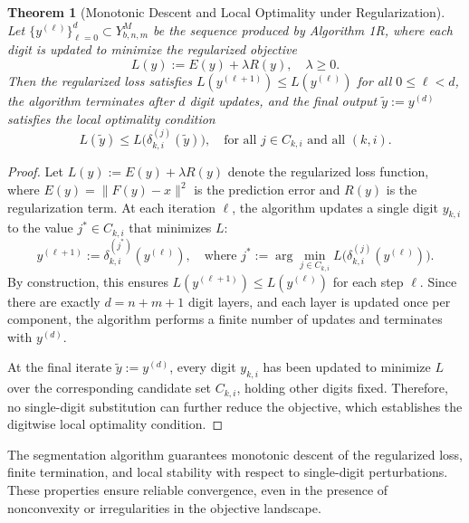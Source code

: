 \documentclass[aps,twocolumn,superscriptaddress,nofootinbib]{revtex4}
\newtheorem{theorem}{Theorem}
\begin{document}
\begin{theorem}[Monotonic Descent and Local Optimality under Regularization]
Let $\{y^{(\ell)}\}_{\ell = 0}^{d} \subset Y^M_{b,n,m}$ be the sequence produced by Algorithm 1R, where each digit is updated to minimize the regularized objective
\begin{equation}
    L(y) := E(y) + \lambda R(y), \quad \lambda \geq 0. \label{eq:regularized-loss}
\end{equation}
Then the regularized loss satisfies $L(y^{(\ell+1)}) \leq L(y^{(\ell)})$ for all $0 \leq \ell < d$, the algorithm terminates after $d$ digit updates, and the final output $\tilde{y} := y^{(d)}$ satisfies the local optimality condition
\begin{equation}
    L(\tilde{y}) \leq L\big(\delta^{(j)}_{k,i}(\tilde{y})\big), \quad \text{for all } j \in C_{k,i} \text{ and all } (k,i). \label{eq:local-minimum}
\end{equation}
\end{theorem}

\begin{proof}
Let $L(y) := E(y) + \lambda R(y)$ denote the regularized loss function, where $E(y) = \|F(y) - x\|^2$ is the prediction error and $R(y)$ is the regularization term. At each iteration $\ell$, the algorithm updates a single digit $y_{k,i}$ to the value $j^* \in C_{k,i}$ that minimizes $L$:
\begin{equation}
    y^{(\ell+1)} := \delta^{(j^*)}_{k,i}(y^{(\ell)}), \quad \text{where } j^* := \arg\min_{j \in C_{k,i}} L\big(\delta^{(j)}_{k,i}(y^{(\ell)})\big). \label{eq:digitwise-selection}
\end{equation}
By construction, this ensures $L(y^{(\ell+1)}) \leq L(y^{(\ell)})$ for each step $\ell$. Since there are exactly $d = n + m + 1$ digit layers, and each layer is updated once per component, the algorithm performs a finite number of updates and terminates with $y^{(d)}$.

At the final iterate $\tilde{y} := y^{(d)}$, every digit $y_{k,i}$ has been updated to minimize $L$ over the corresponding candidate set $C_{k,i}$, holding other digits fixed. Therefore, no single-digit substitution can further reduce the objective, which establishes the digitwise local optimality condition.
\end{proof}

The segmentation algorithm guarantees monotonic descent of the regularized loss, finite termination, and local stability with respect to single-digit perturbations. These properties ensure reliable convergence, even in the presence of nonconvexity or irregularities in the objective landscape.
\end{document}
